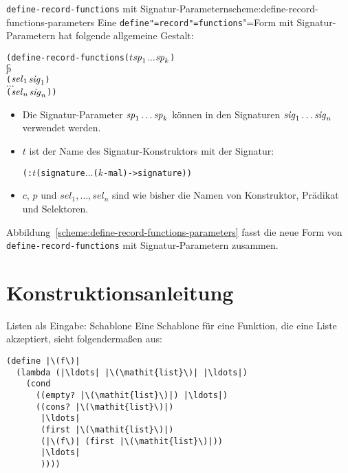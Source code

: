 \begin{feature}{\texttt{define-record-functions} mit Signatur-Parametern}{scheme:define-record-functions-parameters}
Eine \texttt{define"=record"=functions}"=Form
mit Signatur-Parametern hat folgende allgemeine Gestalt:\label{def:define-record-functions-parameters}
%
\begin{alltt}
(define-record-functions (\(t\) \(\mathit{sp}\sb{1}\) \(\ldots\) \(\mathit{sp}\sb{k}\))
  \(c\)
  \(p\)
  (\(\mathit{sel}\sb{1}\) \(\mathit{sig}\sb{1}\))
  \(\ldots\)
  (\(\mathit{sel}\sb{n}\) \(\mathit{sig}\sb{n}\)))
\end{alltt}
%
%
\begin{itemize}
\item Die Signatur-Parameter $\mathit{sp}\sb{1} \ldots \mathit{sp}\sb{k}$
können in den Signaturen
\(\mathit{sig}\sb{1}\ldots\mathit{sig}\sb{n}\) verwendet werden.
\item $t$ ist der Name des Signatur-Konstruktors mit der Signatur:
\begin{alltt}
(: \(t\) (signature \(\ldots\) \textrm{(\(k\)-mal)} -> signature))
\end{alltt}
  \item $c$, $p$ und $\mathit{sel}_1, \ldots, \mathit{sel}_n$ sind wie
    bisher die Namen von Konstruktor, Prädikat und Selektoren.
\end{itemize}
%
\end{feature}

Abbildung~\ref{scheme:define-record-functions-parameters} fasst die
neue Form von \lstinline{define-record-functions} mit
Signatur-Parametern zusammen.

\section{Konstruktionsanleitung}

\begin{konstruktionsanleitung}{Listen als Eingabe: Schablone}
  \label{ka:listen-eingabe-schablone}
Eine Schablone für eine Funktion, die eine Liste akzeptiert, sieht
folgendermaßen aus:
%
\begin{lstlisting}
(define |\(f\)|
  (lambda (|\ldots| |\(\mathit{list}\)| |\ldots|)
    (cond
      ((empty? |\(\mathit{list}\)|) |\ldots|)
      ((cons? |\(\mathit{list}\)|)
       |\ldots|
       (first |\(\mathit{list}\)|)
       (|\(f\)| (first |\(\mathit{list}\)|))
       |\ldots|
       ))))
\end{lstlisting}
  
  
\end{konstruktionsanleitung}

